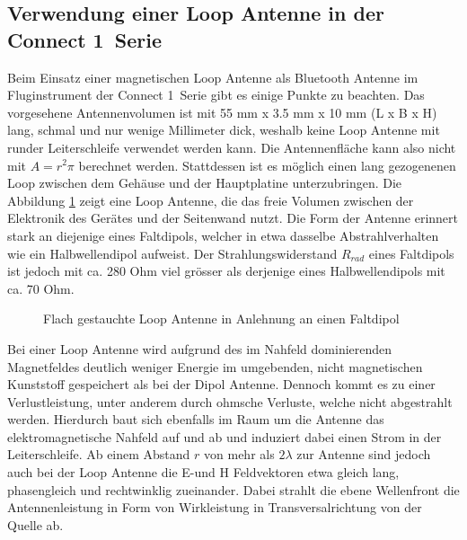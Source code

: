 \subsection{Verwendung einer Loop Antenne in der \glqq Connect 1\grqq \ Serie}
Beim Einsatz einer magnetischen Loop Antenne als Bluetooth Antenne im Fluginstrument der \glqq Connect 1\grqq \ Serie gibt es einige Punkte zu beachten. Das vorgesehene Antennenvolumen ist mit 55 mm x 3.5 mm x 10 mm (L x B x H) lang, schmal und nur wenige Millimeter dick, weshalb keine Loop Antenne mit runder Leiterschleife verwendet werden kann. Die Antennenfläche kann also nicht mit $A=r^{2}\pi$ berechnet werden. Stattdessen ist es möglich einen lang gezogenenen Loop zwischen dem Gehäuse und der Hauptplatine unterzubringen. Die Abbildung \ref{fig:FflacheLoopAntenne} zeigt eine Loop Antenne, die das freie Volumen zwischen der Elektronik des Gerätes und der Seitenwand nutzt. Die Form der Antenne erinnert stark an diejenige eines Faltdipols, welcher in etwa dasselbe Abstrahlverhalten wie ein Halbwellendipol aufweist. Der Strahlungswiderstand $R_{rad}$ eines Faltdipols ist jedoch mit ca. 280 Ohm viel grösser als derjenige eines Halbwellendipols mit ca. 70 Ohm.

\begin{figure}[!ht]
	\begin{center}
	\end{center}
\caption{Flach gestauchte Loop Antenne in Anlehnung an einen Faltdipol}
\label{fig:FflacheLoopAntenne}
\end{figure}

Bei einer Loop Antenne wird aufgrund des im Nahfeld dominierenden Magnetfeldes deutlich weniger Energie im umgebenden, nicht magnetischen Kunststoff gespeichert als bei der Dipol Antenne. Dennoch kommt es zu einer Verlustleistung, unter anderem durch ohmsche Verluste, welche nicht abgestrahlt werden. Hierdurch baut sich ebenfalls im Raum um die Antenne das elektromagnetische Nahfeld auf und ab und induziert dabei einen Strom in der Leiterschleife.
Ab einem Abstand $r$ von mehr als $2\lambda$ zur Antenne sind jedoch auch bei der Loop Antenne die E-und H Feldvektoren etwa gleich lang, phasengleich und rechtwinklig zueinander. Dabei strahlt die ebene Wellenfront die Antennenleistung in Form von Wirkleistung in Transversalrichtung von der Quelle ab.\\

